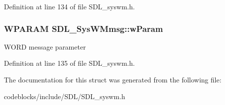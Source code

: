 Definition at line 134 of file S\+D\+L\+\_\+syswm.\+h.

\hypertarget{structSDL__SysWMmsg_a7463730478d90ebc031d83098f3f74fc}{
\subsubsection[{w\+Param}]{\setlength{\rightskip}{0pt plus 5cm}W\+P\+A\+R\+A\+M S\+D\+L\+\_\+\+Sys\+W\+Mmsg\+::w\+Param}}\label{structSDL__SysWMmsg_a7463730478d90ebc031d83098f3f74fc}
W\+O\+R\+D message parameter 

Definition at line 135 of file S\+D\+L\+\_\+syswm.\+h.



The documentation for this struct was generated from the following file\+:\begin{DoxyCompactItemize}
\item 
codeblocks/include/\+S\+D\+L/S\+D\+L\+\_\+syswm.\+h\end{DoxyCompactItemize}
